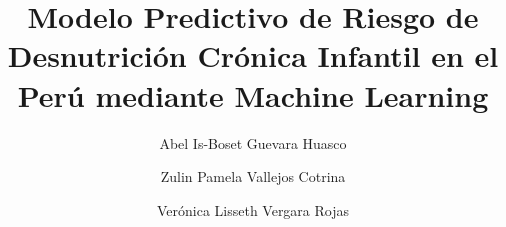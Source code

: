 \documentclass[final,5p,times,twocolumn,authoryear,lefttitle]{elsarticle}
\begin{document}
\begin{frontmatter}



\title{Modelo Predictivo de Riesgo de Desnutrición Crónica Infantil en el Perú mediante Machine Learning}


\author[first]{Abel Is-Boset Guevara Huasco}
\author[first]{Zulin Pamela Vallejos Cotrina}
\author[first]{Verónica Lisseth Vergara Rojas}


\end{frontmatter}
\end{document}

